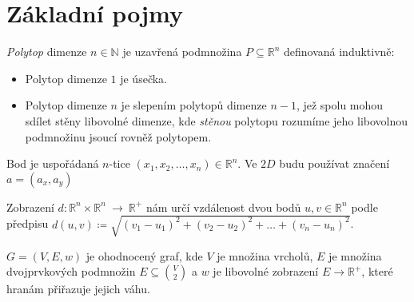 \chapter{Základní pojmy}
\label{chap:zakladni-pojmy}

\begin{definition}[Polytop]
    \emph{Polytop} dimenze $n \in \mathbb{N}$ je uzavřená podmnožina $P \subseteq \mathbb{R}^{n}$ definovaná induktivně:
    \begin{itemize}
        \item Polytop dimenze $1$ je úsečka.
        \item Polytop dimenze $n$ je slepením polytopů dimenze $n-1$, jež spolu mohou
            sdílet stěny libovolné dimenze, kde \emph{stěnou} polytopu rozumíme jeho
            libovolnou podmnožinu jsoucí rovněž polytopem. \autocite{adamklepacDefinicePolytopu2024}
    \end{itemize}
    
\end{definition}

\begin{definition}[Bod]
    \label{definice:bod}
    Bod je uspořádaná $n$-tice $(x_1, x_2, \ldots, x_n) \in \mathbb{R}^n$. Ve $2D$ budu používat značení $a=(a_x, a_y)$
\end{definition}

\begin{definition}[Vzdálenost]
    \label{definice:vzdalenost}
    Zobrazení $d: \mathbb{R}^n\times \mathbb{R}^n~\rightarrow~\mathbb{R}^+$ nám určí vzdálenost dvou bodů $u, v \in \mathbb{R}^n$
    podle předpisu $d(u, v) \coloneqq \sqrt{(v_1-u_1)^2+(v_2-u_2)^2+\ldots+(v_n-u_n)^2}$.
\end{definition}

\begin{definition}
    \label{definice:ohodnoceny_graf}
    $G = (V, E, w)$ je ohodnocený graf, kde $V$ je množina vrcholů, $E$ je množina dvojprvkových podmnožin $E \subseteq \binom{V}{2}$ a $w$ je libovolné zobrazení $E \rightarrow \mathds{R}^+$, které hranám přiřazuje jejich váhu.
\end{definition}

